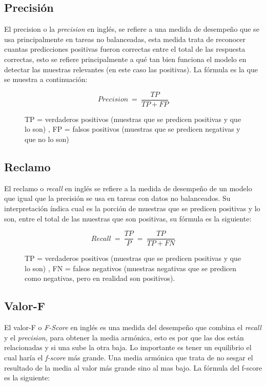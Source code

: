 \subsection{Precisión}

\par El \gls{precision} o la \textit{precision} en inglés, se refiere a una medida de desempeño que se usa principalmente en tareas no balanceadas, esta medida trata de reconocer cuantas predicciones positivas fueron correctas entre el total de las respuesta correctas, esto se refiere principalmente a qué tan bien funciona el modelo en detectar las muestras relevantes (en este caso las positivas). La fórmula es la que se muestra a continuación:
\begin{figure}[H]
	\centering
	\begin{equation*}
		Precision\ =\ \frac{TP}{TP+FP}
	\end{equation*}
	\caption*{TP = verdaderos positivos (muestras que se predicen positivas y que lo son) , FP = falsos positivos (muestras que se predicen negativas y que no lo son)}
\end{figure}


\subsection{Reclamo}

\par El \gls{reclamo} o \textit{recall} en inglés se refiere a la medida de desempeño de un modelo que igual que la precisión se usa en tareas con datos no balanceados. Su interpretación índica cual es la porción de muestras que se predicen positivas y lo son, entre el total de las muestras que son positivas, su fórmula es la siguiente:

\begin{figure}[H]
	\centering
	\begin{equation*}
		Recall\ =\ \frac{TP}{P}\ =\ \frac{TP}{TP+FN}
	\end{equation*}
	\caption*{TP = verdaderos positivos (muestras que se predicen positivas y que lo son) , FN = falsos negativos (muestras negativas que se predicen como negativas, pero en realidad son positivos).}
\end{figure}

\subsection{Valor-F}

\par El \gls{valor-F} o \textit{F-Score} en inglés es una medida del desempeño que combina el \textit{recall} y el \textit{precision}, para obtener la media armónica, esto es por que las dos están relacionadas y si una sube la otra baja. Lo importante es tener un equilibrio el cual haría el \textit{f-score} más grande. Una media armónica que trata de no sesgar el resultado de la media al valor más grande sino al mas bajo. La fórmula del f-score es la siguiente:

